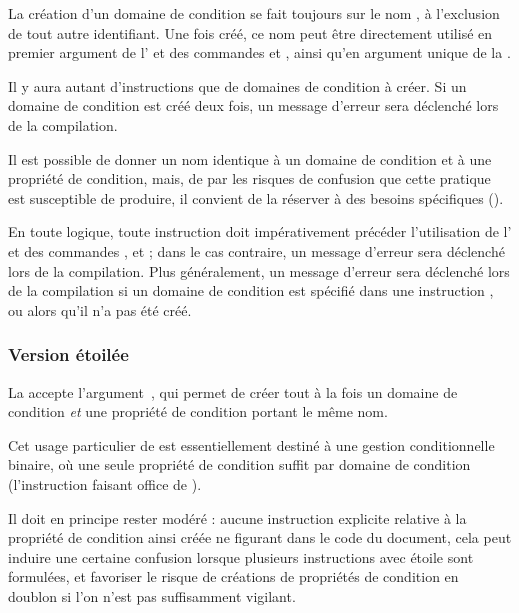 \documentclass{article}
\begin{document}
La création d'un domaine de condition se fait toujours sur le nom , à l'exclusion de tout autre identifiant. Une fois créé, ce nom peut être directement utilisé en premier argument de l' et des commandes  et , ainsi qu'en argument unique de la .

Il y aura autant d'instructions  que de domaines de condition à créer. Si un domaine de condition est créé deux fois, un message d'erreur sera déclenché lors de la compilation.

Il est possible de donner un nom identique à un domaine de condition et à une propriété de condition, mais, de par les risques de confusion que cette pratique est susceptible de produire, il convient de la réserver à des besoins spécifiques ().

En toute logique, toute instruction  doit impérativement précéder l'utilisation de l' et des commandes ,  et  ; dans le cas contraire, un message d'erreur sera déclenché lors de la compilation. Plus généralement, un message d'erreur sera déclenché lors de la compilation si un domaine de condition est spécifié dans une instruction ,  ou  alors qu'il n'a pas été créé.

\subsubsection{Version étoilée}\label{CtDoc_Commandes_NewCondiField_Etoile}
La  accepte l'argument~\val{*}, qui permet de créer tout à la fois un domaine de condition \emph{et} une propriété de condition portant le même nom.

Cet usage particulier de  est essentiellement destiné à une gestion conditionnelle binaire, où une seule propriété de condition suffit par domaine de condition (l'instruction  faisant office de ).

Il doit en principe rester modéré : aucune instruction explicite relative à la propriété de condition ainsi créée ne figurant dans le code du document, cela peut induire une certaine confusion lorsque plusieurs instructions  avec étoile sont formulées, et favoriser le risque de créations de propriétés de condition en doublon si l'on n'est pas suffisamment vigilant.
\end{document}

